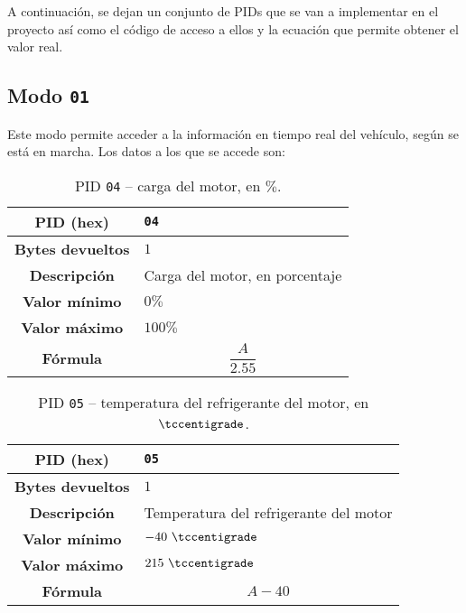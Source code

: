 A continuación, se dejan un conjunto de \ac{PID}s que se van a implementar en el
proyecto así como el código de acceso a ellos y la ecuación que permite obtener el
valor real.

\subsection*{Modo \texttt{01}}
Este modo permite acceder a la información en tiempo real del vehículo, según se
está en marcha. Los datos a los que se accede son:

\begin{table}[H]
  \centering
  \begin{tabularx}{\textwidth}{|c|X|}
    \hline
    \textbf{PID (hex)}       & \texttt{04}                    \\
    \hline
    \textbf{Bytes devueltos} & $1$                            \\
    \hline
    \textbf{Descripción}     & Carga del motor, en porcentaje \\
    \hline
    \textbf{Valor mínimo}    & $0\%$                          \\
    \hline
    \textbf{Valor máximo}    & $100\%$                        \\
    \hline
    \textbf{Fórmula}         &                                %
    \begin{equation*}
      \frac{A}{2.55}
    \end{equation*}                                 \\
    \hline
  \end{tabularx}
  \caption{\ac{PID} \texttt{04} -- carga del motor, en $\%$.}
\end{table}

\begin{table}[H]
  \centering
  \begin{tabularx}{\textwidth}{|c|X|}
    \hline
    \textbf{PID (hex)}       & \texttt{05}                    \\
    \hline
    \textbf{Bytes devueltos} & $1$                            \\
    \hline
    \textbf{Descripción}     & Temperatura del refrigerante del motor \\
    \hline
    \textbf{Valor mínimo}    & $-40~\tccentigrade$                          \\
    \hline
    \textbf{Valor máximo}    & $215~\tccentigrade$                        \\
    \hline
    \textbf{Fórmula}         &                                %
    \begin{equation*}
      A - 40
    \end{equation*}                                 \\
    \hline
  \end{tabularx}
  \caption{\ac{PID} \texttt{05} -- temperatura del refrigerante del motor, en $\tccentigrade$.}
\end{table}

